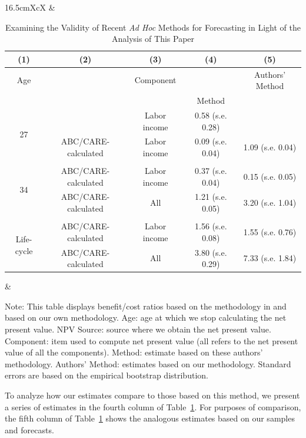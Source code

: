\begin{table}[!htpb]
\begin{threeparttable}
\caption{Examining the Validity of Recent \emph{Ad Hoc} Methods for Forecasting in Light of the Analysis of This Paper}
\label{table:comparing}
\centering
\footnotesize
\begin{tabularx}{16.5cm}{XcX}
& \begin{tabular}{ccccc}
\toprule
(1) & (2) & (3) & (4) & (5)\\ \midrule
Age & \mc{1}{c}{NPV Source} & Component & \citet{Kline_Walters_2016_QJE} & Authors' Method \\
& & & Method & \\ \midrule
\multirow{2}{*}{27} & \cite{Chetty_Friedman_etal_2011_QJoE} & Labor income & 0.58 (s.e. 0.28) &  \\
& ABC/CARE-calculated & Labor income & 0.09 (s.e. 0.04) &  1.09 (s.e. 0.04)\\ \\
\multirow{2}{*}{34} & ABC/CARE-calculated & Labor income & 0.37 (s.e. 0.04) & 0.15 (s.e. 0.05) \\
& ABC/CARE-calculated & All & 1.21 (s.e. 0.05) &  3.20 (s.e. 1.04) \\ \\
\multirow{2}{*}{Life-cycle} &  ABC/CARE-calculated & Labor income & 1.56 (s.e. 0.08) & 1.55 (s.e. 0.76) \\
& ABC/CARE-calculated & All & 3.80 (s.e. 0.29) & 7.33 (s.e. 1.84) \\
\bottomrule
\end{tabular}
&
\end{tabularx}
\begin{tablenotes}
\footnotesize
\item Note: This table displays benefit/cost ratios based on the methodology in \citet{Kline_Walters_2016_QJE} and based on our own methodology. Age: age at which we stop calculating the net present value. NPV Source: source where we obtain the net present value. Component: item used to compute net present value (all refers to the net present value of all the components). \citet{Kline_Walters_2016_QJE} Method: estimate based on these authors' methodology. Authors' Method: estimates based on our methodology. Standard errors are based on the empirical bootstrap distribution.
\end{tablenotes}
\end{threeparttable}
\end{table}

To analyze how our estimates compare to those based on this method, we present a series of estimates in the fourth column of Table~\ref{table:comparing}. For purposes of comparison, the fifth column of Table~\ref{table:comparing} shows the analogous estimates based on our samples and forecasts.

